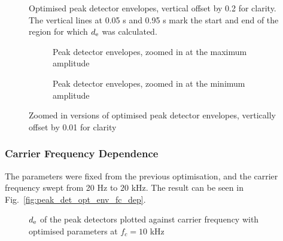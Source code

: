 \documentclass[../main2.tex]{subfiles}
\providecommand{\rootdir}{..}
\begin{document}
\begin{figure}[h]
\centerline{}
\caption{Optimised peak detector envelopes, vertical offset by 0.2 for clarity. The vertical lines at 0.05 s and 0.95 s mark the start and end of the region for which $d_\text{e}$ was calculated.}
\label{fig:peak_det_opt_env}
\end{figure}
\begin{figure}

\captionsetup{justification=centering}
\begin{subfigure}{\linewidth}
\centering
\centerline{}
\caption{Peak detector envelopes, zoomed in at the maximum amplitude}
\end{subfigure}

\par\bigskip

\captionsetup{justification=centering}
\begin{subfigure}{\linewidth}
\centering
\centerline{}
\caption{Peak detector envelopes, zoomed in at the minimum amplitude}
\end{subfigure}

\caption{Zoomed in versions of optimised peak detector envelopes, vertically offset by 0.01 for clarity}
\label{fig:peak_det_opt_env_zoom}
\end{figure}

\subsubsection{Carrier Frequency Dependence}
The parameters were fixed from the previous optimisation, and the carrier frequency swept from 20 Hz to $20$ kHz. The result can be seen in Fig.~\ref{fig:peak_det_opt_env_fc_dep}.

\begin{figure}[h]
\captionsetup{justification=centering}
\begin{subfigure}{\linewidth}
\centerline{}
\end{subfigure}
\par\bigskip
\begin{subfigure}{\linewidth}
\centerline{}
\end{subfigure}
\caption{$d_\text{e}$ of the peak detectors plotted against carrier frequency with optimised parameters at $f_c=10$ kHz}
\label{fig:peak_det_opt_env_fc10000_dep_error}
\end{figure}
\end{document}
